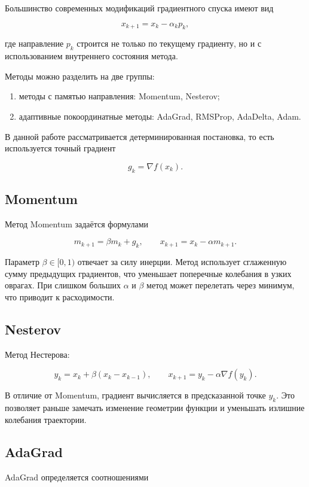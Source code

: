\documentclass[a4paper,12pt]{article}
\newcommand{\grad}{\nabla}
\begin{document}
Большинство современных модификаций градиентного спуска
имеют вид

\[
x_{k+1}=x_k-\alpha_k p_k,
\]

где направление $p_k$ строится не только по текущему
градиенту, но и с использованием внутреннего состояния
метода.

Методы можно разделить на две группы:

\begin{enumerate}
    \item методы с памятью направления:
    Momentum, Nesterov;

    \item адаптивные покоординатные методы:
    AdaGrad, RMSProp, AdaDelta, Adam.
\end{enumerate}

В данной работе рассматривается детерминированная постановка,
то есть используется точный градиент

\[
g_k=\grad f(x_k).
\]

\subsection{Momentum}

Метод Momentum задаётся формулами

\[
m_{k+1}=\beta m_k+g_k,
\qquad
x_{k+1}=x_k-\alpha m_{k+1}.
\]

Параметр $\beta\in[0,1)$ отвечает за силу инерции.
Метод использует сглаженную сумму предыдущих градиентов,
что уменьшает поперечные колебания в узких оврагах.
При слишком больших $\alpha$ и $\beta$
метод может перелетать через минимум,
что приводит к расходимости.

\subsection{Nesterov}

Метод Нестерова:

\[
y_k=x_k+\beta(x_k-x_{k-1}),
\qquad
x_{k+1}=y_k-\alpha \grad f(y_k).
\]

В отличие от Momentum,
градиент вычисляется в предсказанной точке $y_k$.
Это позволяет раньше замечать изменение геометрии функции
и уменьшать излишние колебания траектории.

\subsection{AdaGrad}

AdaGrad определяется соотношениями
\end{document}
